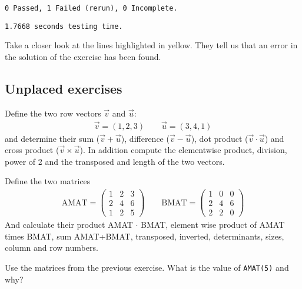 \begin{lstlisting}[basicstyle=\tiny, backgroundcolor=\color{yellow}]
   0 Passed, 1 Failed (rerun), 0 Incomplete.
\end{lstlisting}
\begin{lstlisting}[basicstyle=\tiny]
   1.7668 seconds testing time.
\end{lstlisting}

Take a closer look at the lines highlighted in yellow.
They tell us that an error in the solution of the exercise has been found.



\subsection{Unplaced exercises}

\begin{ex}
Define the two row vectors $\vec{v}$ and $\vec{u}$:
\begin{align*}
\vec{v} = (1, 2, 3) \qquad \vec{u} = (3, 4, 1)
\end{align*}
and determine their 
sum ($\vec{v} + \vec{u}$),
difference ($\vec{v} - \vec{u}$),
dot product ($\vec{v} \cdot \vec{u}$) and
cross product ($\vec{v} \times \vec{u}$).
In addition compute the elementwise product, division, power of 2 and 
the transposed and length of the two vectors.
\end{ex}


\begin{ex}
Define the two matrices
\begin{align*}
\textrm{AMAT} = \begin{pmatrix}
1 &2 &3	\\
2 &4 &6	\\
1 &2 &5
\end{pmatrix}
\qquad
\textrm{BMAT} =
\begin{pmatrix}
1 &0 &0	\\
2 &4 &6	\\
2 &2 &0
\end{pmatrix}
\end{align*}
And calculate their product AMAT $\cdot$ BMAT, element wise product of AMAT times BMAT, sum
AMAT+BMAT, transposed, inverted, determinants, sizes, column and row numbers.
\end{ex}


\begin{ex}
Use the matrices from the previous exercise. What is the value of \verb!AMAT(5)! and why?
\end{ex}



